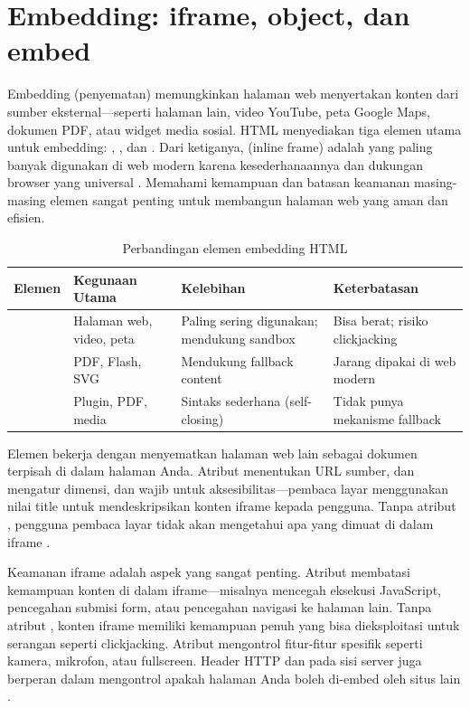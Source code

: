 ﻿\section{Embedding: iframe, object, dan embed}

Embedding (penyematan) memungkinkan halaman web menyertakan konten dari sumber eksternal---seperti halaman lain, video YouTube, peta Google Maps, dokumen PDF, atau widget media sosial. HTML menyediakan tiga elemen utama untuk embedding: , , dan . Dari ketiganya,  (inline frame) adalah yang paling banyak digunakan di web modern karena kesederhanaannya dan dukungan browser yang universal \cite{mdnHtmlIntro}. Memahami kemampuan dan batasan keamanan masing-masing elemen sangat penting untuk membangun halaman web yang aman dan efisien.

\begin{table}[H]
\centering
\begin{tabular}{|P{2.2cm}|P{3.5cm}|P{3cm}|P{3cm}|}
\hline
\textbf{Elemen} & \textbf{Kegunaan Utama} & \textbf{Kelebihan} & \textbf{Keterbatasan} \\
\hline
{} & Halaman web, video, peta & Paling sering digunakan; mendukung sandbox & Bisa berat; risiko clickjacking \\
\hline
{} & PDF, Flash, SVG & Mendukung fallback content & Jarang dipakai di web modern \\
\hline
{} & Plugin, PDF, media & Sintaks sederhana (self-closing) & Tidak punya mekanisme fallback \\
\hline
\end{tabular}
\caption{Perbandingan elemen embedding HTML}
\end{table}

Elemen  bekerja dengan menyematkan halaman web lain sebagai dokumen terpisah di dalam halaman Anda. Atribut  menentukan URL sumber,  dan  mengatur dimensi, dan  wajib untuk aksesibilitas---pembaca layar menggunakan nilai title untuk mendeskripsikan konten iframe kepada pengguna. Tanpa atribut , pengguna pembaca layar tidak akan mengetahui apa yang dimuat di dalam iframe \cite{mdnAccessibility}.

Keamanan iframe adalah aspek yang sangat penting. Atribut  membatasi kemampuan konten di dalam iframe---misalnya mencegah eksekusi JavaScript, pencegahan submisi form, atau pencegahan navigasi ke halaman lain. Tanpa atribut , konten iframe memiliki kemampuan penuh yang bisa dieksploitasi untuk serangan seperti clickjacking. Atribut  mengontrol fitur-fitur spesifik seperti kamera, mikrofon, atau fullscreen. Header HTTP  dan  pada sisi server juga berperan dalam mengontrol apakah halaman Anda boleh di-embed oleh situs lain \cite{whatwgHtml}.

